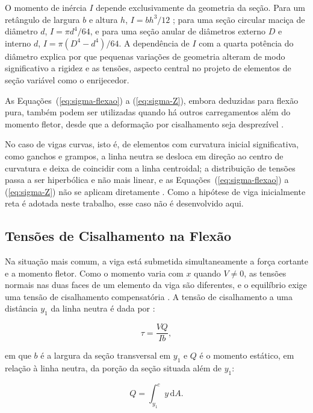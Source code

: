 \documentclass[arial,centeredequations,english,brazilian,oneside,section=TITLE]{ifes8}
\begin{document}
O momento de inércia $I$ depende exclusivamente da geometria da seção. Para um
retângulo de largura $b$ e altura $h$, $I = b h^3/12$ \cite{Norton2013}; para
uma seção circular maciça de diâmetro $d$, $I = \pi d^4/64$, e para uma seção
anular de diâmetros externo $D$ e interno $d$, $I = \pi (D^4 - d^4)/64$. A dependência
de $I$ com a quarta potência do diâmetro explica por que pequenas variações de
geometria alteram de modo significativo a rigidez e as tensões, aspecto central no
projeto de elementos de seção variável como o enrijecedor.

As Equações~(\ref{eq:sigma-flexao}) a (\ref{eq:sigma-Z}), embora deduzidas para
flexão pura, também podem ser utilizadas quando há outros carregamentos além do
momento fletor, desde que a deformação por cisalhamento seja desprezível
\cite{Norton2013}.

No caso de vigas curvas, isto é, de elementos com curvatura inicial significativa,
como ganchos e grampos, a linha neutra se desloca em direção ao centro de curvatura
e deixa de coincidir com a linha centroidal; a distribuição de tensões passa a ser
hiperbólica e não mais linear, e as Equações~(\ref{eq:sigma-flexao}) a
(\ref{eq:sigma-Z}) não se aplicam diretamente \cite{Norton2013}.
Como a hipótese de viga inicialmente reta é adotada neste trabalho, esse caso não é
desenvolvido aqui.

\subsection{Tensões de Cisalhamento na Flexão}
\label{sub:cisalhamento-flexao}

Na situação mais comum, a viga está submetida simultaneamente a força cortante e a
momento fletor. Como o momento varia com $x$ quando $V \neq 0$, as tensões normais nas
duas faces de um elemento da viga são diferentes, e o equilíbrio exige uma tensão de
cisalhamento compensatória \cite{Norton2013}. A tensão de cisalhamento
a uma distância $y_1$ da linha neutra é dada por \cite{Norton2013}:

\begin{equation}
  \label{eq:tau-flexao}
  \tau = \frac{V Q}{I b},
\end{equation}

em que $b$ é a largura da seção transversal em $y_1$ e $Q$ é o momento estático, em
relação à linha neutra, da porção da seção situada além de $y_1$:

\begin{equation}
  \label{eq:Q}
  Q = \int_{y_1}^{c} y\,\mathrm{d}A.
\end{equation}
\end{document}
